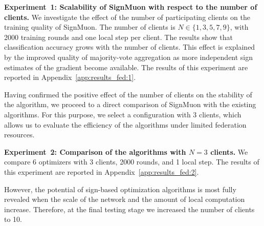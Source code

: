 \documentclass{article}
\begin{document}
\textbf{Experiment~1: Scalability of SignMuon with respect to the number of clients.} 
We investigate the effect of the number of participating clients on the training quality of SignMuon. The number of clients is $N \in \{1, 3, 5, 7, 9\}$, with 2000 training rounds and one local step per client. The results show that classification accuracy grows with the number of clients. This effect is explained by the improved quality of majority-vote aggregation as more independent sign estimates of the gradient become available. The results of this experiment are reported in Appendix~\ref{app:results_fed:1}.

Having confirmed the positive effect of the number of clients on the stability of the algorithm, we proceed to a direct comparison of SignMuon with the existing algorithms. For this purpose, we select a configuration with 3 clients, which allows us to evaluate the efficiency of the algorithms under limited federation resources.

\textbf{Experiment~2: Comparison of the algorithms with $N=3$ clients.} We compare 6 optimizers with 3 clients, 2000 rounds, and 1 local step. The results of this experiment are reported in Appendix~\ref{app:results_fed:2}.

However, the potential of sign-based optimization algorithms is most fully revealed when the scale of the network and the amount of local computation increase. Therefore, at the final testing stage we increased the number of clients to 10.
\end{document}

